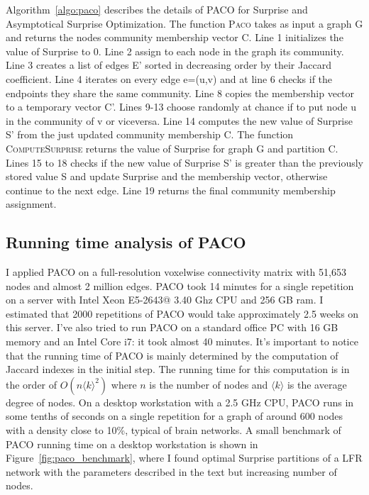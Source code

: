 Algorithm~\ref{algo:paco} describes the details of PACO for Surprise and Asymptotical Surprise Optimization.
The function \textsc{Paco} takes as input a graph G and returns the nodes community membership vector C. Line 1 initializes the value of Surprise to 0. Line 2 assign to each node in the graph its community. Line 3 creates a list of edges E' sorted in decreasing order by their Jaccard coefficient. Line 4 iterates on every edge e=(u,v) and at line 6 checks if the endpoints they share the same community. Line 8 copies the membership vector to a temporary vector C'. Lines 9-13 choose randomly at chance if to put node u in the community of v or viceversa. Line 14 computes the new value of Surprise S' from the just updated community membership C. The function \textsc{ComputeSurprise} returns the value of Surprise for graph G and partition C. Lines 15 to 18 checks if the new value of Surprise S' is greater than the previously stored value S and update Surprise and the membership vector, otherwise continue to the next edge. Line 19 returns the final community membership assignment.




\subsection{Running time analysis of PACO}
I applied PACO on a full-resolution voxelwise connectivity matrix with 51,653 nodes and almost 2 million edges.
PACO took 14 minutes for a single repetition on a server with Intel Xeon E5-2643@ 3.40 Ghz CPU and 256 GB ram.
I estimated that 2000 repetitions of PACO would take approximately 2.5 weeks on this server.
I've also tried to run PACO on a standard office PC with 16 GB memory and an Intel Core i7: it took almost 40 minutes.
It's important to notice that the running time of PACO is mainly determined by the computation of Jaccard indexes in the initial step.
The running time for this computation is in the order of $O(n\langle k \rangle^2)$ where $n$ is the number of nodes and $\langle k \rangle$ is the average degree of nodes.
On a desktop workstation with a 2.5 GHz CPU, PACO runs in some tenths of seconds on a single repetition for a graph of around 600 nodes with a density close to 10\%, typical of brain networks.
A small benchmark of PACO running time on a desktop workstation is shown in Figure~\ref{fig:paco_benchmark}, where I found optimal Surprise partitions of a LFR network with the parameters described in the text but increasing number of nodes.

